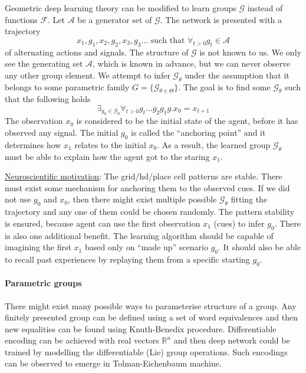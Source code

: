 \documentclass[12pt]{article}
\begin{document}
Geometric deep learning theory can be modified to learn groups $\mathcal{G}$ instead of functions $\mathcal{F}$. Let $\mathcal{A}$ be a generator set of $\mathcal{G}$. The network is presented with a trajectory 
\[x_1,g_1,x_2,g_2,x_3,g_3... \text{ such that } \forall_{t>0} g_t \in \mathcal{A}\] 
of alternating actions and signals. The structure of $\mathcal{G}$ is not known to us. We only see the generating set $\mathcal{A}$, which is known in advance, but we can never observe any other group element. We attempt to infer  $\mathcal{G}_\theta$ under the assumption that  it belongs to some parametric family $G=\{\mathcal{G}_{\theta\in\Theta}\}$. The goal is to find some $\mathcal{G}_\theta$ such that the following holds 
\[
\exists_{ g_0\in\mathcal{G}_\theta} \forall_{t>0} g_t...g_2g_1g.x_0 = x_{t+1}
\] The observation $x_0$ is considered to be the initial state of the agent, before it has observed any signal. The initial $g_0$ is called the ``anchoring point'' and it determines how $x_1$ relates to the initial $x_0$. As a result, the learned group $\mathcal{G}_\theta$ must be able to explain how the agent got to the staring $x_1$. 

\underline{Neuroscientific motivation}: The grid/hd/place cell patterns are stable. There must exist some mechanism for anchoring them to the observed cues. If we did not use $g_0$ and $x_0$, then there might exist multiple possible $\mathcal{G}_\theta$ fitting the trajectory and any one of them could be chosen randomly. The pattern stability is ensured, because agent can use the first observation $x_1$ (cues) to infer $g_0$.
There is also one additional benefit. The learning algorithm should be capable of imagining the first $x_1$ based only on ``made up'' scenario $g_0$. It should also be able to recall past experiences by replaying them from a specific starting $g_0$.

\paragraph{Parametric groups}

There might exist many possible ways to parameterise structure of a group. Any finitely presented group can be defined using a set of word equivalences and then new equalities can be found using Knuth-Benedix procedure. Differentiable encoding can be achieved with real vectors $\mathbb{R}^n$ and then deep network could be trained by modelling the differentiable (Lie) group operations. Such encodings can be observed to emerge in Tolman-Eichenbaum machine. 
\end{document}
